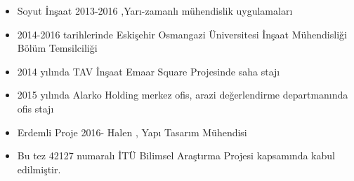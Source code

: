 \begin{itemize}
\item Soyut İnşaat 2013-2016 ,Yarı-zamanlı mühendislik uygulamaları
\item 2014-2016 tarihlerinde Eskişehir Osmangazi Üniversitesi İnşaat Mühendisliği
Bölüm Temsilciliği
\item 2014 yılında TAV İnşaat Emaar Square Projesinde saha stajı
\item 2015 yılında Alarko Holding merkez ofis, arazi değerlendirme departmanında
ofis stajı
\item Erdemli Proje 2016- Halen , Yapı Tasarım Mühendisi
\item Bu tez 42127 numaralı İTÜ Bilimsel Araştırma Projesi kapsamında kabul
edilmiştir.
\end{itemize}
